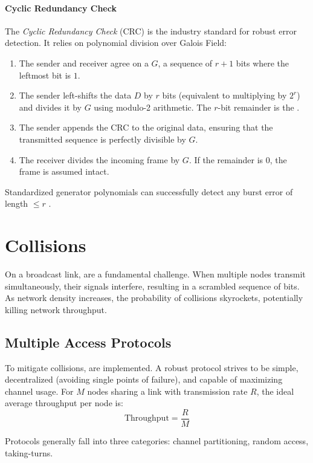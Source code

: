 \paragraph{Cyclic Redundancy Check}
The \emph{Cyclic Redundancy Check} (CRC) is the industry standard for robust error detection. It relies on polynomial division over Galois Field:
\begin{enumerate}
    \item The sender and receiver agree on a  \( G \), a sequence of \( r+1 \) bits where the leftmost bit is \( 1 \).
    \item The sender left-shifts the data \( D \) by \( r \) bits (equivalent to multiplying by \( 2^r \)) and divides it by \( G \) using modulo-2 arithmetic. The \( r \)-bit remainder is the .
    \item The sender appends the CRC to the original data, ensuring that the transmitted sequence is perfectly divisible by \( G \).
    \item The receiver divides the incoming frame by \( G \). If the remainder is \( 0 \), the frame is assumed intact.
\end{enumerate}
Standardized generator polynomials can successfully detect any burst error of length \(\leq r\) \cite{kurose2017}.

\section{Collisions}
On a broadcast link,  are a fundamental challenge. When multiple nodes transmit simultaneously, their signals interfere, resulting in a scrambled sequence of bits. As network density increases, the probability of collisions skyrockets, potentially killing network throughput.

\subsection{Multiple Access Protocols}
To mitigate collisions,  are implemented. A robust protocol strives to be simple, decentralized (avoiding single points of failure), and capable of maximizing channel usage. For \( M \) nodes sharing a link with transmission rate \( R \), the ideal average throughput per node is:
\[ \text{Throughput} = \frac{R}{M} \]

Protocols generally fall into three categories: channel partitioning, random access, taking-turns.


